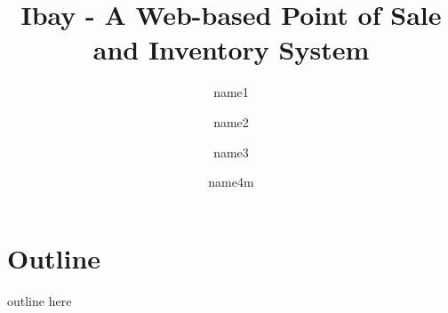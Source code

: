\documentclass{report}
\title{Ibay - A Web-based Point of Sale and Inventory System}
\author{name1}
\author{name2}
\author{name3}
\author{name4m}
\date{}
\begin{document}
\maketitle

\tableofcontents

\chapter{Outline}
outline here
\end{document}
